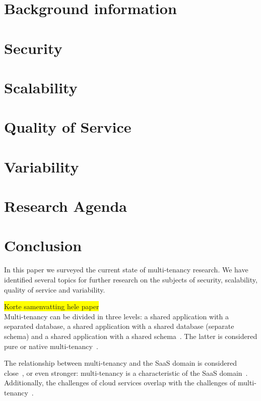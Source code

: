 \documentclass{article}
\newcommand{\highlight}[1]{\colorbox{yellow}{#1}}
\begin{document}
\section{Background information}
\label{sec:bg}


\section{Security}
\label{sec:security}


\section{Scalability}
\label{sec:scalability}


\section{Quality of Service}
\label{sec:qos}


\section{Variability}
\label{sec:variability}


\section{Research Agenda}
\label{sec:ra}


\section{Conclusion}
\label{sec:conclusion}
In this paper we surveyed the current state of multi-tenancy research.
We have identified several topics for further research on the subjects of security, scalability, quality of service and variability.

\highlight{Korte samenvatting hele paper}\\
Multi-tenancy can be divided in three levels: a shared application with a separated database, a shared application with a shared database (separate schema) and a shared application with a shared schema~\cite{bezemer2010multi}. The latter is considered pure or native multi-tenancy~\cite{bezemer2010multi,lin2009feedback,aulbach2009comparison}.

The relationship between multi-tenancy and the \ac{SaaS} domain is considered close~\cite{dillon2010cloud}, or even stronger: multi-tenancy is a characteristic of the \ac{SaaS} domain~\cite{tsai2010towards}. Additionally, the challenges of cloud services overlap with the challenges of multi-tenancy~\cite{dillon2010cloud,krebs2012architecture}.
\end{document}
